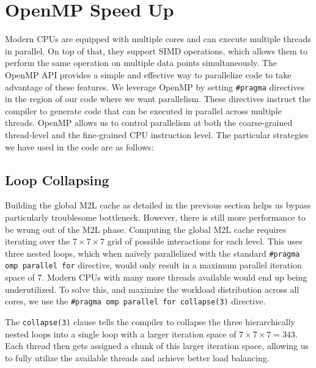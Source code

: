 \section{OpenMP Speed Up} \label{sec:openmp-speed-up}
Modern \ac{CPU}s are equipped with multiple cores and can execute multiple threads in parallel. On top of that, they support \ac{SIMD} operations, which allows them to perform the same operation on multiple data points simultaneously. The OpenMP \ac{API} provides a simple and effective way to parallelize code to take advantage of these features. We leverage OpenMP by setting \texttt{\#pragma} directives in the region of our code where we want parallelism. These directives instruct the compiler to generate code that can be executed in parallel across multiple threads. OpenMP allows us to control parallelism at both the coarse-grained thread-level and the fine-grained \ac{CPU} instruction level. The particular strategies we have used in the code are as follows:

\subsection{Loop Collapsing} \label{sec:loop-collapsing}
Building the global \ac{M2L} cache as detailed in the previous section helps us bypass particularly troublesome bottleneck. However, there is still more performance to be wrung out of the \ac{M2L} phase. Computing the global \ac{M2L} cache requires iterating over the $7\times7\times7$ grid of possible interactions for each level. This uses three nested loops, which when na\"ively parallelized with the standard \texttt{\#pragma omp parallel for} directive, would only result in a maximum parallel iteration space of 7. Modern \ac{CPU}s with many more threads available would end up being underutilized. To solve this, and maximize the workload distribution across all cores, we use the \texttt{\#pragma omp parallel for collapse(3)} directive. 

The \texttt{collapse(3)} clause tells the compiler to collapse the three hierarchically nested loops into a single loop with a larger iteration space of $7\times7\times7 = 343$. Each thread then gets assigned a chunk of this larger iteration space, allowing us to fully utilize the available threads and achieve better load balancing.
